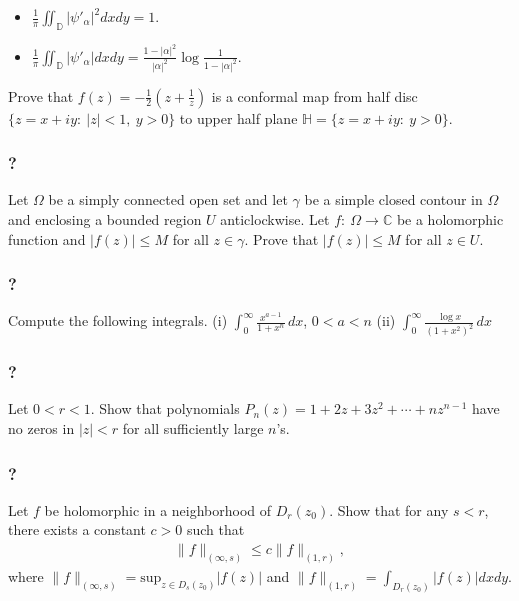 \begin{itemize}
\item
  \(\displaystyle{\frac{1}{\pi}\iint_{{\mathbb D}} |\psi'_{\alpha}|^2 dx dy =1}\).
\item
  \(\displaystyle{\frac{1}{\pi}\iint_{{\mathbb D}} |\psi'_{\alpha}| dx dy =\frac{1-|\alpha|^2}{|\alpha|^2} \log \frac{1}{1-|\alpha|^2}}\).
\end{itemize}

Prove that
\(\displaystyle{f(z)=-\frac{1}{2}\left(z+\frac{1}{z}\right)}\) is a
conformal map from half disc \(\{z=x+iy:\ |z|<1,\ y>0\}\) to upper half
plane \(\mathbb H=\{z=x+iy:\ y>0\}\).

\hypertarget{section-187}{%
\subsubsection{?}\label{section-187}}

Let \(\Omega\) be a simply connected open set and let \(\gamma\) be a
simple closed contour in \(\Omega\) and enclosing a bounded region \(U\)
anticlockwise. Let \(f: \ \Omega \to {\mathbb C}\) be a holomorphic
function and \(|f(z)|\leq M\) for all \(z\in \gamma\). Prove that
\(|f(z)|\leq M\) for all \(z\in U\).

\hypertarget{section-188}{%
\subsubsection{?}\label{section-188}}

Compute the following integrals. (i)
\(\displaystyle \int_0^\infty \frac{x^{a-1}}{1 + x^n} \, dx\),
\(0< a < n\) (ii)
\(\displaystyle \int_0^\infty \frac{\log x}{(1 + x^2)^2}\, dx\)

\hypertarget{section-189}{%
\subsubsection{?}\label{section-189}}

Let \(0<r<1\). Show that polynomials
\(P_n(z) = 1 + 2z + 3 z^2 + \cdots + n z^{n-1}\) have no zeros in
\(|z|<r\) for all sufficiently large \(n\)'s.

\hypertarget{section-190}{%
\subsubsection{?}\label{section-190}}

Let \(f\) be holomorphic in a neighborhood of \(D_r(z_0)\). Show that
for any \(s<r\), there exists a constant \(c>0\) such that
\begin{align*}\|f\|_{(\infty, s)} \leq c \|f\|_{(1, r)},\end{align*}
where
\(\displaystyle \|f\|_{(\infty, s)} = \text{sup}_{z \in D_s(z_0)}|f(z)|\)
and \(\displaystyle \|f\|_{(1, r)} = \int_{D_r(z_0)} |f(z)|dx dy\).

